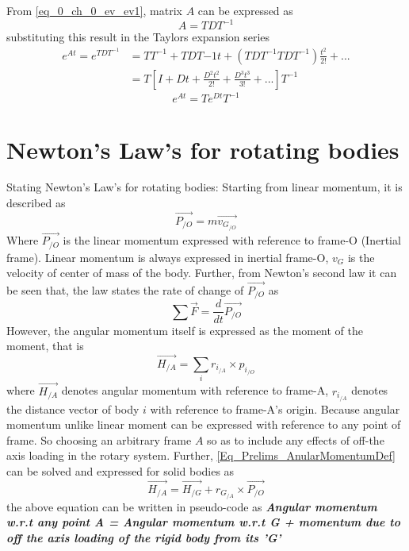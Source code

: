 From \eqref{eq_0_ch_0_ev_ev1}, matrix $A$ can be expressed as
\begin{equation}
	A = TDT^{-1}
\end{equation}
substituting this result in the Taylors expansion series
\begin{align*}
	e^{At} = e^{TDT^{-1}} &= TT^{-1} + TDT{-1}t + (TDT^{-1}TDT^{-1})\frac{t^{2}}{2!} + ... \\
						  &= T[I + Dt + \frac{D^{2}t^{2}}{2!} + \frac{D^{3}t^{3}}{3!}+ ...]T^{-1}
\end{align*}
\begin{equation}
	e^{At} = T e^{Dt} T^{-1}
\end{equation}

\section{Newton's Law's for rotating bodies}

Stating Newton's Law's for rotating bodies:
Starting from linear momentum, it is described as 
\begin{equation}
\vec{P_{/O}} = m \vec{v_{G_{/O}}}
\end{equation}
Where $\vec{P_{/O}}$ is the linear momentum expressed with reference to frame-O (Inertial frame). Linear momentum is always expressed in inertial frame-O, $v_{G}$ is the velocity of center of mass of the body. Further, from Newton's second law it can be seen that, the law states the rate of change of $\vec{P_{/O}}$ as
\begin{equation}
\sum \vec{F} = \frac{d}{dt}\vec{P_{/O}}
\end{equation}
However, the angular momentum itself is expressed as the moment of the moment, that is
\begin{equation}\label{Eq_Prelims_AnularMomentumDef}
\vec{H_{/A}} = \sum_{i}^{} r_{i_{/A}} \times p_{i_{/O}}
\end{equation}
where $\vec{H_{/A}}$ denotes angular momentum with reference to frame-A, $r_{i_{/A}}$ denotes the distance vector of body $i$ with reference to frame-A's origin. Because angular momentum unlike linear moment can be expressed with reference to any point of frame. So choosing an arbitrary frame $A$ so as to include any effects of off-the axis loading in the rotary system. Further, \eqref{Eq_Prelims_AnularMomentumDef} can be solved and expressed for solid bodies as
\begin{equation} \label{Eq_Prelims_AngularMomentumFormula}
	\vec{H_{/A}} = \vec{H_{/G}} + r_{G_{/A}} \times \vec{P_{/O}}
\end{equation}
the above equation can be written in pseudo-code as
\textbf{\textit{Angular momentum w.r.t any point A = Angular momentum w.r.t G + momentum due to off the axis loading of the rigid body from its 'G'}}

